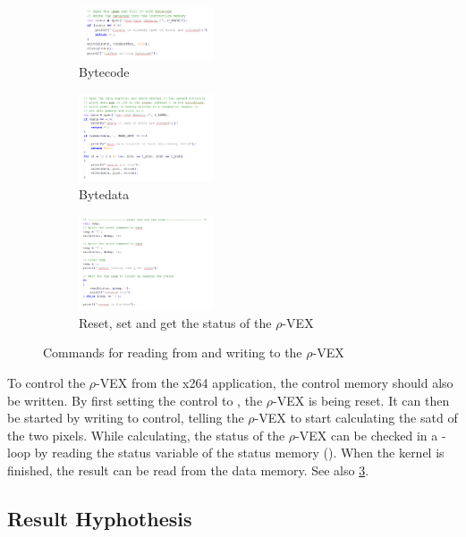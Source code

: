 \begin{figure}[htb]
	\centering
	\begin{subfigure} [h] {0.3\textwidth}
		\centering
		\includegraphics[width=150px]{Pictures/imem}
		\caption{Bytecode}
		\label{fig:imem}
	\end{subfigure}
	\quad
	\begin{subfigure} [h] {0.3\textwidth}
		\centering
		\includegraphics[width=150px]{Pictures/dmem}
		\caption{Bytedata}
		\label{fig:dmem}
	\end{subfigure}
	\quad
	\begin{subfigure} [h] {0.3\textwidth}
		\centering
		\includegraphics[width=150px]{Pictures/smem}
		\caption{Reset, set and get the status of the $\rho$-VEX}
		\label{fig:smem}
	\end{subfigure}
	\quad
\caption{Commands for reading from and writing to the $\rho$-VEX}%
\label{}%
\end{figure}

To control the $\rho$-VEX from the x264 application, the control memory should also be written. By first setting the control to , the $\rho$-VEX is being reset. It can then be started by writing  to control, telling the $\rho$-VEX to start calculating the satd of the two pixels. While calculating, the status of the $\rho$-VEX can be checked in a -loop by reading the status variable of the status memory (). When the  kernel is finished, the result can be read from the data memory. See also \ref{fig:smem}.

\subsection{Result Hyphothesis}

